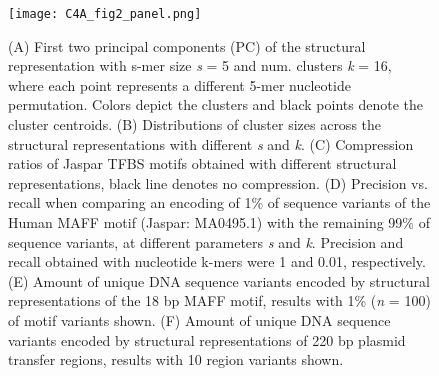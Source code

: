 \documentclass[sigconf]{acmart}
\begin{document}
\begin{figure}[t]
  \centering
  \texttt{[image: C4A\_fig2\_panel.png]}
  \caption{(A) First two principal components (PC) of the structural representation with s-mer size \textit{s} = 5 and num. clusters \textit{k} = 16, where each point represents a different 5-mer nucleotide permutation. Colors depict the clusters and black points denote the cluster centroids. (B) Distributions of cluster sizes across the structural representations with different \textit{s} and \textit{k}. (C) Compression ratios of Jaspar TFBS motifs obtained with different structural representations, black line denotes no compression. (D) Precision vs. recall when comparing an encoding of 1\% of sequence variants of the Human MAFF motif (Jaspar: MA0495.1) with the remaining 99\% of sequence variants, at different parameters \textit{s} and \textit{k}. Precision and recall obtained with nucleotide k-mers were 1 and 0.01, respectively. (E) Amount of unique DNA sequence variants encoded by structural representations of the 18 bp MAFF motif, results with 1\% (\textit{n} = 100) of motif variants shown. (F) Amount of unique DNA sequence variants encoded by structural representations of 220 bp plasmid transfer regions, results with 10 region variants shown.}
\end{figure}
\end{document}
